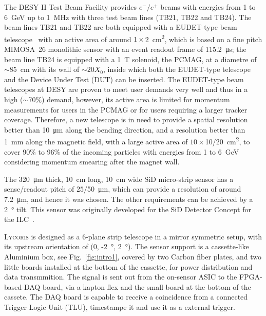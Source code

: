 \documentclass[conference]{IEEEtran}
\def\lycoris{\textsc{Lycoris }}%
\begin{document}
The DESY II Test Beam Facility\cite{desytbf}
provides $e^-/e^+$ beams with energies from 1 to \SI{6}{\GeV} up to \SI{1}{\MHz}
with three test beam lines (TB21, TB22 and TB24).
The beam lines TB21 and TB22 are both equipped with a EUDET-type beam telescope~\cite{eudet}
with an active area of around $1\times$\SI{2}{\square\centi\metre},
which is based on a fine pitch \uppercase{mimosa}~26 monolithic sensor with an event readout frame of \SI{115.2}{\micro\second};
the beam line TB24 is equipped with a \SI{1}{\tesla} solenoid, the PCMAG, at a diametre of $\sim$\SI{85}{\centi\metre} with its wall of $\sim20X_0$,
inside which both the EUDET-type telescope and the Device Under Test (DUT) can be inserted.
The EUDET-type beam telescopes at DESY are proven to meet user demands very well and thus in a high ($\sim$70\%) demand,
however, its active area is limited for momentum measurements for users in the PCMAG or for users requiring a larger tracker coverage.
Therefore, a new telescope is in need to provide a spatial resolution better than \SI{10}{\micro\metre} along the bending direction,
and a resolution better than \SI{1}{\milli\metre} along the magnetic field,
with a large active area of $10\times$10/\SI{20}{\square\centi\metre},
to cover 90\% to 96\% of the incoming particles with energies from 1 to \SI{6}{\GeV} considering momentum smearing after the magnet wall.

The \SI{320}{\micro\metre} thick, \SI{10}{cm} long, \SI{10}{cm} wide SiD micro-strip sensor has a sense/readout pitch of $25/$\SI{50}{\micro\metre},
which can provide a resolution of around \SI{7.2}{\micro\metre}, and hence it was chosen.
The other requirements can be achieved by a \SI{2}{\degree} tilt.
This sensor was originally developed for the SiD Detector Concept for the ILC~\cite{Behnke:2013lya}.

\lycoris is designed as a 6-plane strip telescope in a mirror symmetric setup, with its upstream orientation of (0, -\SI{2}{\degree}, \SI{2}{\degree}).
The sensor support is a cassette-like Aluminium box, see Fig.~\ref{fig:intro1}, covered by two Carbon fiber plates,
and two little boards installed at the bottom of the cassette, for power distribution and data transmmition.
The signal is sent out from the on-sensor ASIC to the FPGA-based DAQ board, via a kapton flex and the small board at the bottom of the cassete.
The DAQ board is capable to receive a coincidence from a connected Trigger Logic Unit (TLU), timestampe it and use it as a external trigger.
\end{document}
